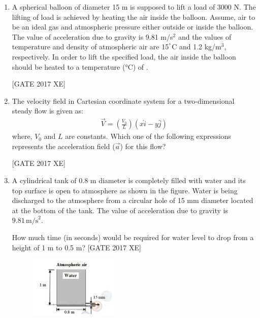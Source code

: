\documentclass[journal,12pt,onecolumn]{IEEEtran}
\theoremstyle{remark}
\begin{document}
\begin{enumerate}
\item A spherical balloon of diameter 15 m is supposed to lift a load of 3000 N. 
The lifting of load is achieved by heating the air inside the balloon. 
Assume, air to be an ideal gas and atmospheric pressure either outside or inside the balloon. 
The value of acceleration due to gravity is 9.81 m/s$^2$ and the values of temperature 
and density of atmospheric air are 15$^\degree$C and 1.2 kg/m$^3$, respectively. 
In order to lift the specified load, the air inside the balloon should be heated to a temperature (°C) of \underline{\hspace{2cm}}. 

\hfill [GATE 2017 XE]




\item The velocity field in Cartesian coordinate system for a two-dimensional steady flow is given as:
\begin{align}
    \vec{V} = \left( \frac{V_0}{L} \right) (x \hat{i} - y \hat{j})
\end{align}
where, $V_0$ and $L$ are constants. Which one of the following expressions represents the acceleration field ($\vec{a}$) for this flow?

\hfill [GATE 2017 XE]

\begin{enumerate}
\end{enumerate}
\item A cylindrical tank of 0.8 m diameter is completely filled with water and its top surface is open to atmosphere as shown in the figure.  
Water is being discharged to the atmosphere from a circular hole of 15 mm diameter located at the bottom of the tank.  
The value of acceleration due to gravity is $9.81 \,\text{m/s}^2$.  

How much time (in seconds) would be required for water level to drop from a height of 1 m to 0.5 m?  
\hfill [GATE 2017 XE]

\begin{figure}[H]
    \centering
    \includegraphics[width=0.5\linewidth]{figs/fig6.png}
    \caption{}
    \label{fig:fig6}
\end{figure}


\end{enumerate}
\end{document}
